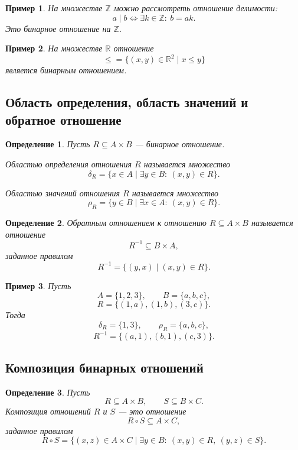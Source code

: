 \documentclass[12pt,a4paper]{article}
\newtheorem{definition}{Определение}
\newtheorem{example}{Пример}
\begin{document}
\begin{example}
На множестве $\mathbb Z$ можно рассмотреть отношение делимости:
\[
a\mid b \iff \exists k\in\mathbb Z:\ b=ak.
\]
Это бинарное отношение на $\mathbb Z$.
\end{example}

\begin{example}
На множестве $\mathbb R$ отношение
\[
\leqslant=\{(x,y)\in\mathbb R^2\mid x\leq y\}
\]
является бинарным отношением.
\end{example}

\subsection{Область определения, область значений и обратное отношение}

\begin{definition}
Пусть $R\subseteq A\times B$ --- бинарное отношение.

\emph{Областью определения} отношения $R$ называется множество
\[
\delta_R=\{x\in A\mid \exists y\in B:\ (x,y)\in R\}.
\]

\emph{Областью значений} отношения $R$ называется множество
\[
\rho_R=\{y\in B\mid \exists x\in A:\ (x,y)\in R\}.
\]
\end{definition}

\begin{definition}
\emph{Обратным отношением} к отношению $R\subseteq A\times B$ называется отношение
\[
R^{-1}\subseteq B\times A,
\]
заданное правилом
\[
R^{-1}=\{(y,x)\mid (x,y)\in R\}.
\]
\end{definition}

\begin{example}
Пусть
\[
A=\{1,2,3\},\qquad B=\{a,b,c\},
\]
\[
R=\{(1,a),(1,b),(3,c)\}.
\]
Тогда
\[
\delta_R=\{1,3\},
\qquad
\rho_R=\{a,b,c\},
\]
\[
R^{-1}=\{(a,1),(b,1),(c,3)\}.
\]
\end{example}

\subsection{Композиция бинарных отношений}

\begin{definition}
Пусть
\[
R\subseteq A\times B,\qquad S\subseteq B\times C.
\]
\emph{Композиция} отношений $R$ и $S$ --- это отношение
\[
R\circ S\subseteq A\times C,
\]
заданное правилом
\[
R\circ S
=
\{(x,z)\in A\times C\mid \exists y\in B:\ (x,y)\in R,\ (y,z)\in S\}.
\]
\end{definition}
\end{document}
